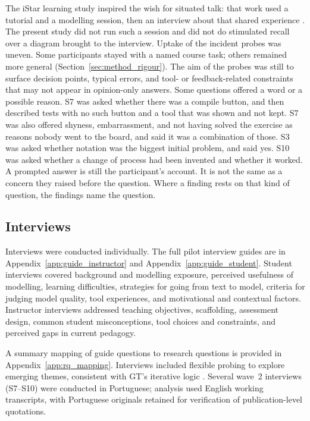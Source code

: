 The iStar learning study inspired the wish for situated talk: that work used a tutorial and a modelling session, then an interview about that shared experience \cite{istar-learning}. The present study did not run such a session and did not do stimulated recall over a diagram brought to the interview. Uptake of the incident probes was uneven. Some participants stayed with a named course task; others remained more general (Section~\ref{sec:method_rigour}). The aim of the probes was still to surface decision points, typical errors, and tool- or feedback-related constraints that may not appear in opinion-only answers. Some questions offered a word or a possible reason. S7 was asked whether there was a compile button, and then described tests with no such button and a tool that was shown and not kept. S7 was also offered shyness, embarrassment, and not having solved the exercise as reasons nobody went to the board, and said it was a combination of those. S3 was asked whether notation was the biggest initial problem, and said yes. S10 was asked whether a change of process had been invented and whether it worked. A prompted answer is still the participant's account. It is not the same as a concern they raised before the question. Where a finding rests on that kind of question, the findings name the question.

\subsection{Interviews}
\label{subsec:method_interviews}

Interviews were conducted individually. The full pilot interview guides are in Appendix~\ref{app:guide_instructor} and Appendix~\ref{app:guide_student}. Student interviews covered background and modelling exposure, perceived usefulness of modelling, learning difficulties, strategies for going from text to model, criteria for judging model quality, tool experiences, and motivational and contextual factors. Instructor interviews addressed teaching objectives, scaffolding, assessment design, common student misconceptions, tool choices and constraints, and perceived gaps in current pedagogy.

A summary mapping of guide questions to research questions is provided in Appendix~\ref{app:rq_mapping}. Interviews included flexible probing to explore emerging themes, consistent with GT's iterative logic \cite{adolph2011using,stol2016grounded}. Several wave~2 interviews (S7--S10) were conducted in Portuguese; analysis used English working transcripts, with Portuguese originals retained for verification of publication-level quotations.

